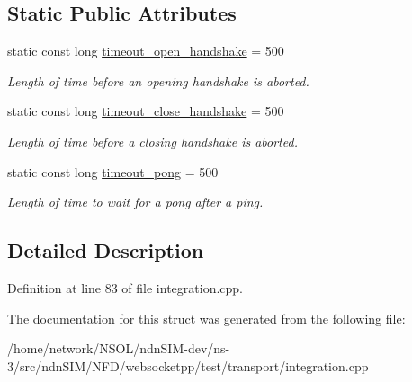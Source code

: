 \subsection*{Static Public Attributes}
\begin{DoxyCompactItemize}
\item 
static const long \hyperlink{structconfig__tls_a0c6b3960fc997f92c8d9e57a1e9a6f7f}{timeout\+\_\+open\+\_\+handshake} = 500\hypertarget{structconfig__tls_a0c6b3960fc997f92c8d9e57a1e9a6f7f}{}\label{structconfig__tls_a0c6b3960fc997f92c8d9e57a1e9a6f7f}

\begin{DoxyCompactList}\small\item\em Length of time before an opening handshake is aborted. \end{DoxyCompactList}\item 
static const long \hyperlink{structconfig__tls_a6739e7cd1bcb205eafe4031253c1dffc}{timeout\+\_\+close\+\_\+handshake} = 500\hypertarget{structconfig__tls_a6739e7cd1bcb205eafe4031253c1dffc}{}\label{structconfig__tls_a6739e7cd1bcb205eafe4031253c1dffc}

\begin{DoxyCompactList}\small\item\em Length of time before a closing handshake is aborted. \end{DoxyCompactList}\item 
static const long \hyperlink{structconfig__tls_af0898008c9b8e2218f6bea1da15a0297}{timeout\+\_\+pong} = 500\hypertarget{structconfig__tls_af0898008c9b8e2218f6bea1da15a0297}{}\label{structconfig__tls_af0898008c9b8e2218f6bea1da15a0297}

\begin{DoxyCompactList}\small\item\em Length of time to wait for a pong after a ping. \end{DoxyCompactList}\end{DoxyCompactItemize}


\subsection{Detailed Description}


Definition at line 83 of file integration.\+cpp.



The documentation for this struct was generated from the following file\+:\begin{DoxyCompactItemize}
\item 
/home/network/\+N\+S\+O\+L/ndn\+S\+I\+M-\/dev/ns-\/3/src/ndn\+S\+I\+M/\+N\+F\+D/websocketpp/test/transport/integration.\+cpp\end{DoxyCompactItemize}
